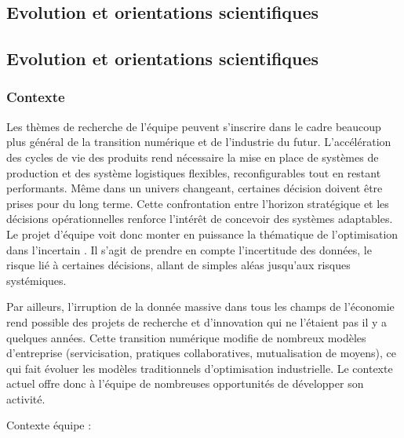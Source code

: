 		\subsection{Evolution et orientations scientifiques}
		

		\subsection{Evolution et orientations scientifiques}
		
		
			
		
		\subsubsection{Contexte}
		
		Les thèmes de recherche de l'équipe peuvent s'inscrire dans le cadre beaucoup plus général de la transition numérique et de l'industrie du futur. 
		L'accélération des cycles de vie des produits rend nécessaire la mise en place de systèmes de production et des système logistiques flexibles, reconfigurables tout en restant performants. 
		Même dans un univers changeant, certaines décision doivent être prises pour du long terme. 
		Cette confrontation entre l'horizon stratégique et les décisions opérationnelles renforce l'intérêt de concevoir des systèmes adaptables. 
		Le projet d'équipe voit donc monter en puissance la thématique de l'optimisation dans l'incertain . 
		Il s'agit de prendre en compte l'incertitude des données, le risque lié à certaines décisions, allant de simples aléas 	jusqu'aux risques systémiques. 
		
		Par ailleurs, l'irruption de la donnée massive dans tous les champs de l'économie rend possible des projets de recherche et d'innovation qui ne l'étaient pas il y a quelques années. 
		Cette transition numérique modifie de nombreux modèles d'entreprise (servicisation, pratiques collaboratives, mutualisation de moyens), ce qui fait évoluer les modèles traditionnels d'optimisation industrielle. 
		Le contexte actuel offre donc à l'équipe de nombreuses opportunités de développer son activité. 


	Contexte équipe : 
			
